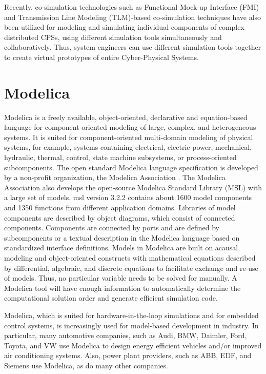 Recently, co-simulation technologies such as Functional Mock-up Interface (FMI) \cite{fmi, fmiblochwitz} and Transmission Line Modeling (TLM)-based co-simulation techniques \cite{tlmkurs90,tlmcogan,tlmjohns,tlmkurs99} have also been utilized for modeling and simulating individual components of complex distributed CPSs, using different simulation tools simultaneously and collaboratively. Thus, system engineers can use different simulation tools together to create virtual prototypes of entire Cyber-Physical Systems. 

\section{Modelica}
\label{sec:modelica}


Modelica \cite{modelica, modelicapeterbook, modelicapeter} is a freely available, object-oriented, declarative and equation-based language for component-oriented modeling of large, complex, and heterogeneous systems. It is suited for component-oriented multi-domain modeling of physical systems, for example, systems containing electrical, electric power, mechanical, hydraulic, thermal, control, state machine subsystems, or process-oriented subcomponents. 
The open standard Modelica language specification is developed by a non-profit organization, the Modelica Association \cite{modelicaassociation}. The Modelica Association also develops the open-source Modelica Standard Library (MSL) \cite{modelicamsl} with a large set of models. \acrshort{msl} version 3.2.2 \cite{modelica, modelicamsl} contains about 1600 model components and 1350 functions from different application domains. Libraries of model components are described by object diagrams, which consist of connected components. Components are connected by ports and are defined by subcomponents or a textual description in the Modelica language based on standardized interface definitions.
Models in Modelica are built on acausal modeling and object-oriented constructs with mathematical equations described by differential, algebraic, and discrete equations to facilitate exchange and re-use of models. Thus, no particular variable needs to be solved for manually. A Modelica tool will have enough information to automatically determine the computational solution order and generate efficient simulation code.

Modelica, which is suited for hardware-in-the-loop simulations and for embedded control systems, is increasingly used for model-based development in industry. In particular, many automotive companies, such as Audi, BMW, Daimler, Ford, Toyota, and VW use Modelica to design energy efficient vehicles and/or improved air conditioning systems. Also, power plant providers, such as ABB, EDF, and Siemens use Modelica, as do many other companies.

